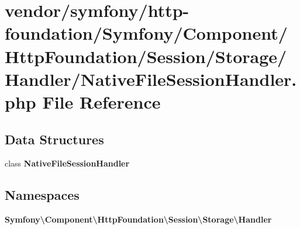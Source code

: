 \section{vendor/symfony/http-\/foundation/\+Symfony/\+Component/\+Http\+Foundation/\+Session/\+Storage/\+Handler/\+Native\+File\+Session\+Handler.php File Reference}
\label{_native_file_session_handler_8php}
\subsection*{Data Structures}
\begin{DoxyCompactItemize}
\item 
class {\bf Native\+File\+Session\+Handler}
\end{DoxyCompactItemize}
\subsection*{Namespaces}
\begin{DoxyCompactItemize}
\item 
 {\bf Symfony\textbackslash{}\+Component\textbackslash{}\+Http\+Foundation\textbackslash{}\+Session\textbackslash{}\+Storage\textbackslash{}\+Handler}
\end{DoxyCompactItemize}
